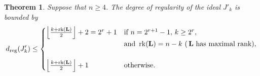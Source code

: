 \documentclass[11pt]{article}
\DeclarePairedDelimiter{\fl}{\lfloor}{\rfloor}
\theoremstyle{plain}
\newtheorem{theo}{Theorem}[section]
\theoremstyle{definition}
\theoremstyle{remark}
\begin{document}
\begin{theo}\label{thm:dregS'}
Suppose that $n\geq 4$. The degree of regularity of the ideal $J'_k$ is bounded by
    \begin{equation*}
        d_{\operatorname{reg}}(J_k')\leq\begin{cases}
            \fl*{\frac{k+\operatorname{rk}(\mathbf{L})}{2}}+2=2^r+1&\text{if }n=2^{r+1}-1,\,k\geq 2^r,\\
            &\text{and }\operatorname{rk}(\mathbf{L})=n-k\text{ (\,$\mathbf{L}$ has maximal rank)},\\
            \\
            \fl*{\frac{k+\operatorname{rk}(\mathbf{L})}{2}}+1&\text{otherwise}.
        \end{cases} 
    \end{equation*}
\end{theo}
\end{document}
